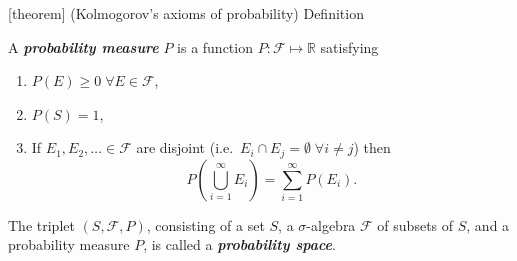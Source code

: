 \documentclass[12pt]{report}
\theoremstyle{definition}
\begin{document}
[theorem]
{(Kolmogorov's axioms of probability) Definition}
\begin{probability measure and space}
    A \textbf{\emph{probability measure}} $P$ is a function
    $P:\mathcal{F}\mapsto\mathbb{R}$ satisfying
    \begin{enumerate}[label = (\alph*)]
        \item $P(E)\ge 0 \;\forall E\in\mathcal{F}$,
        \item $P(S)=1$,
        \item If $E_1,E_2,\ldots\in\mathcal{F}$ are disjoint (i.e.\ $E_i\cap
            E_j=\emptyset \;\forall i\neq j$) then
            \[
                P\left(\bigcup_{i=1}^{\infty}E_i\right)=
                \sum_{i=1}^{\infty} P(E_i).
            \]
    \end{enumerate} 
    The triplet $(S,\mathcal{F},P)$, consisting of a set $S$, a $\sigma$-algebra
    $\mathcal{F}$ of subsets of $S$, and a probability measure $P$, is called a
    \textbf{\emph{probability space}}.
\end{probability measure and space}
\end{document}
